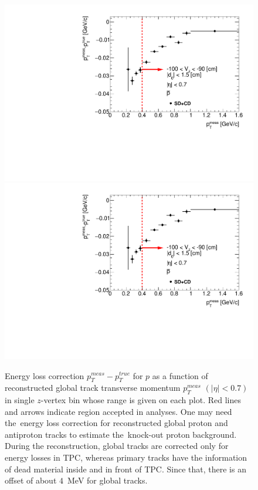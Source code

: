 \begin{figure}[H]
\caption[Energy loss correction for $p$ as a function of reconstructed global track transverse momentum $p_T^{meas}$.]{Energy loss correction $p_T^{meas}-p_T^{true}$ for $p$ as a function of reconstructed global track transverse momentum $p_T^{meas}$ $\left(|\eta|<0.7\right)$ in single $z$-vertex bin whose range is given on each plot. Red lines and arrows indicate region accepted in analyses. One may need the~energy loss correction for reconstructed global proton and antiproton tracks to estimate the~knock-out proton background. During the reconstruction, global tracks are corrected only for energy losses in TPC, whereas primary tracks have the information of dead material inside and in front of TPC. Since that, there is an offset of about $4$~MeV for global tracks.}\label{fig:energyLossPrimaryPGlobal}
\parbox{0.329\textwidth}{
  \includegraphics[width=\linewidth,page=23]{graphics/energyLoss/energyLoss3DGlobal_OnePrtAlso.pdf}\\
  \includegraphics[width=\linewidth,page=26]{graphics/energyLoss/energyLoss3DGlobal_OnePrtAlso.pdf}\\
}
\end{figure}
